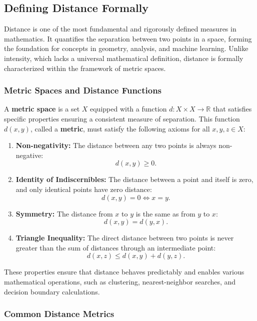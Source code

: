 \subsection{Defining Distance Formally}

Distance is one of the most fundamental and rigorously defined measures in mathematics. It quantifies the separation between two points in a space, forming the foundation for concepts in geometry, analysis, and machine learning. Unlike intensity, which lacks a universal mathematical definition, distance is formally characterized within the framework of metric spaces.

\subsubsection{Metric Spaces and Distance Functions}

A \textbf{metric space} is a set \( X \) equipped with a function \( d: X \times X \to \mathbb{R} \) that satisfies specific properties ensuring a consistent measure of separation. This function \( d(x, y) \), called a \textbf{metric}, must satisfy the following axioms for all \( x, y, z \in X \):

\begin{enumerate}
    \item \textbf{Non-negativity:} The distance between any two points is always non-negative:
    \[
    d(x, y) \geq 0.
    \]
    \item \textbf{Identity of Indiscernibles:} The distance between a point and itself is zero, and only identical points have zero distance:
    \[
    d(x, y) = 0 \iff x = y.
    \]
    \item \textbf{Symmetry:} The distance from \( x \) to \( y \) is the same as from \( y \) to \( x \):
    \[
    d(x, y) = d(y, x).
    \]
    \item \textbf{Triangle Inequality:} The direct distance between two points is never greater than the sum of distances through an intermediate point:
    \[
    d(x, z) \leq d(x, y) + d(y, z).
    \]
\end{enumerate}

These properties ensure that distance behaves predictably and enables various mathematical operations, such as clustering, nearest-neighbor searches, and decision boundary calculations.

\subsubsection{Common Distance Metrics}


